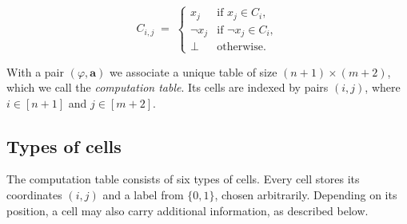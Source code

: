 \documentclass{article}
\theoremstyle{plain}
\theoremstyle{definition}
\newcommand{\tuple}{\mathbf}
\begin{document}
\[
C_{i,j} \;=\;
\begin{cases}
    x_j & \text{if } x_j \in C_i, \\[6pt]
    \neg x_j & \text{if } \neg x_j \in C_i, \\[6pt]
    \bot & \text{otherwise.}
\end{cases}
\]



With a pair \((\varphi, \tuple{a})\) we associate a unique table of size
$(n+1) \times (m+2)$, which we call the \emph{computation table}.
Its cells are indexed by pairs $(i,j)$, where
$i \in [n+1]$ and $j \in [m+2]$.



\bigskip

\subsection{Types of cells}\label{types_of_cells}

The computation table consists of six types of cells.
Every cell stores its coordinates $(i,j)$ and a label from $\{0,1\}$, chosen
arbitrarily. Depending on its position, a cell may also carry additional
information, as described below.
\end{document}
